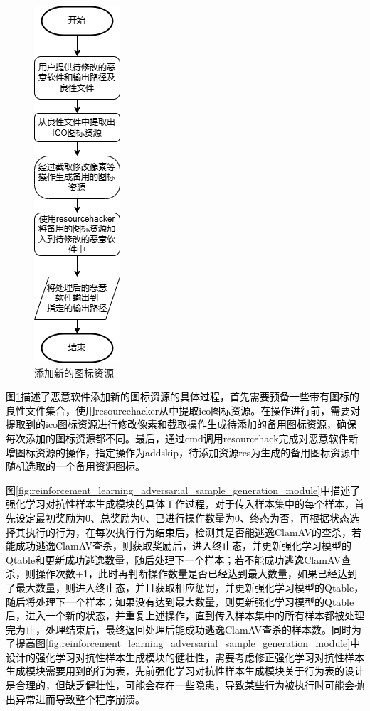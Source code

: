\begin{figure}
  \centering
  \includegraphics[]{images/add_resources.png}
  \caption{添加新的图标资源}\label{fig:add_resources}
\end{figure}

\textcolor{black}{图\ref{fig:add_resources}描述了恶意软件添加新的图标资源的具体过程，首先需要预备一些带有图标的良性文件集合，使用resourcehacker从中提取ico图标资源。在操作进行前，需要对提取到的ico图标资源进行修改像素和截取操作生成待添加的备用图标资源，确保每次添加的图标资源都不同。最后，通过cmd调用resourcehack完成对恶意软件新增图标资源的操作，指定操作为addskip，待添加资源res为生成的备用图标资源中随机选取的一个备用资源图标。}

\textcolor{black}{图\ref{fig:reinforcement_learning_adversarial_sample_generation_module}中描述了强化学习对抗性样本生成模块的具体工作过程，对于传入样本集中的每个样本，首先设定最初奖励为0、总奖励为0、已进行操作数量为0、终态为否，再根据状态选择其执行的行为，在每次执行行为结束后，检测其是否能逃逸ClamAV的查杀，若能成功逃逸ClamAV查杀，则获取奖励后，进入终止态，并更新强化学习模型的Qtable和更新成功逃逸数量，随后处理下一个样本；若不能成功逃逸ClamAV查杀，则操作次数+1，此时再判断操作数量是否已经达到最大数量，如果已经达到了最大数量，则进入终止态，并且获取相应惩罚，并更新强化学习模型的Qtable，随后将处理下一个样本；如果没有达到最大数量，则更新强化学习模型的Qtable后，进入一个新的状态，并重复上述操作，直到传入样本集中的所有样本都被处理完为止，处理结束后，最终返回处理后能成功逃逸ClamAV查杀的样本数。同时为了提高图\ref{fig:reinforcement_learning_adversarial_sample_generation_module}中设计的强化学习对抗性样本生成模块的健壮性，需要考虑修正强化学习对抗性样本生成模块需要用到的行为表，先前强化学习对抗性样本生成模块关于行为表的设计是合理的，但缺乏健壮性，可能会存在一些隐患，导致某些行为被执行时可能会抛出异常进而导致整个程序崩溃。}

